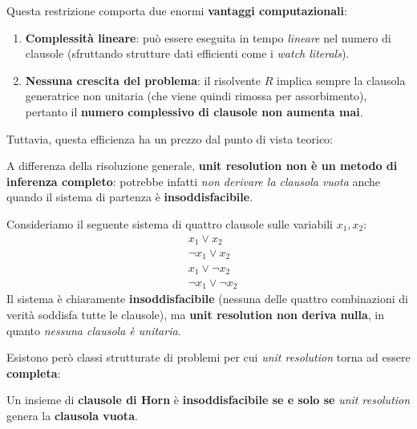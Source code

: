 Questa restrizione comporta due enormi \textbf{vantaggi computazionali}:
\begin{enumerate}
    \item \textbf{Complessità lineare}: può essere eseguita in tempo \textit{lineare} nel 
        numero di clausole (sfruttando strutture dati efficienti come i \textit{watch literals}).
    \item \textbf{Nessuna crescita del problema}: il risolvente $R$ implica sempre la 
        clausola generatrice non unitaria (che viene quindi rimossa per assorbimento), 
        pertanto il \textbf{numero complessivo di clausole non aumenta mai}.
\end{enumerate}

Tuttavia, questa efficienza ha un prezzo dal punto di vista teorico:

\begin{remark}
    A differenza della risoluzione generale, \textbf{unit resolution non è un metodo di 
    inferenza completo}: potrebbe infatti \textit{non derivare la clausola vuota} anche 
    quando il sistema di partenza è \textbf{insoddisfacibile}.
\end{remark}

\begin{exa}
    Consideriamo il seguente sistema di quattro clausole sulle variabili $x_1, x_2$:
    \[
        \begin{aligned}
            &x_1 \lor x_2 \\
            &\neg x_1 \lor x_2 \\
            &x_1 \lor \neg x_2 \\
            &\neg x_1 \lor \neg x_2
        \end{aligned}
    \]
    Il sistema è chiaramente \textbf{insoddisfacibile} (nessuna delle quattro combinazioni 
    di verità soddisfa tutte le clausole), ma \textbf{unit resolution non deriva nulla}, 
    in quanto \textit{nessuna clausola è unitaria}.
\end{exa}

Esistono però classi strutturate di problemi per cui \textit{unit resolution} torna ad 
essere \textbf{completa}: 

\begin{prop}
    Un insieme di \textbf{clausole di Horn} è \textbf{insoddisfacibile se e solo se} 
    \textit{unit resolution} genera la \textbf{clausola vuota}.
\end{prop}


